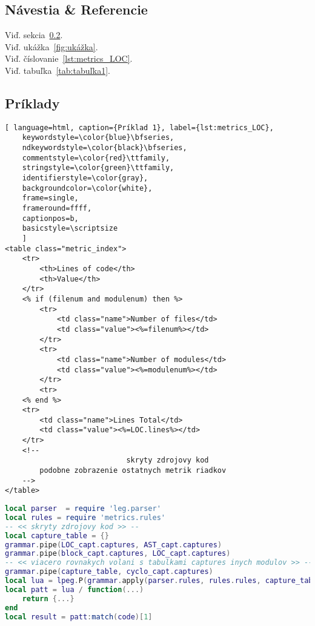 \subsection{Návestia \& Referencie}
Viď. sekcia~\ref{sec:Príklady}.\\
Viď. ukážka~\ref{fig:ukážka}.\\
Viď. číslovanie~\ref{lst:metrics_LOC}.\\
Viď. tabuľka~\ref{tab:tabuľka1}.

\subsection{Príklady}
\label{sec:Príklady}

\begin{lstlisting}[ language=html, caption={Príklad 1}, label={lst:metrics_LOC},
	keywordstyle=\color{blue}\bfseries,
	ndkeywordstyle=\color{black}\bfseries,
	commentstyle=\color{red}\ttfamily,
	stringstyle=\color{green}\ttfamily,
	identifierstyle=\color{gray},
	backgroundcolor=\color{white}, 
	frame=single, 
	frameround=ffff,
	captionpos=b,
	basicstyle=\scriptsize
	]
<table class="metric_index">
	<tr>
		<th>Lines of code</th>
		<th>Value</th>
	</tr>
	<% if (filenum and modulenum) then %>
		<tr>
			<td class="name">Number of files</td>
			<td class="value"><%=filenum%></td>
		</tr>
		<tr>
			<td class="name">Number of modules</td>
			<td class="value"><%=modulenum%></td>
		</tr>
		<tr>
	<% end %>
	<tr>
		<td class="name">Lines Total</td>
		<td class="value"><%=LOC.lines%></td>
	</tr>
	<!--
							skryty zdrojovy kod
		podobne zobrazenie ostatnych metrik riadkov
	-->
</table>
\end{lstlisting}

\begin{lstlisting}[language=lua, caption={Názov}, label=metrics.pipe]
local parser  = require 'leg.parser'
local rules = require 'metrics.rules'
-- << skryty zdrojovy kod >> --
local capture_table = {}
grammar.pipe(LOC_capt.captures, AST_capt.captures)
grammar.pipe(block_capt.captures, LOC_capt.captures)
-- << viacero rovnakych volani s tabulkami captures inych modulov >> --
grammar.pipe(capture_table, cyclo_capt.captures)
local lua = lpeg.P(grammar.apply(parser.rules, rules.rules, capture_table))
local patt = lua / function(...) 
	return {...} 
end
local result = patt:match(code)[1]
\end{lstlisting}

